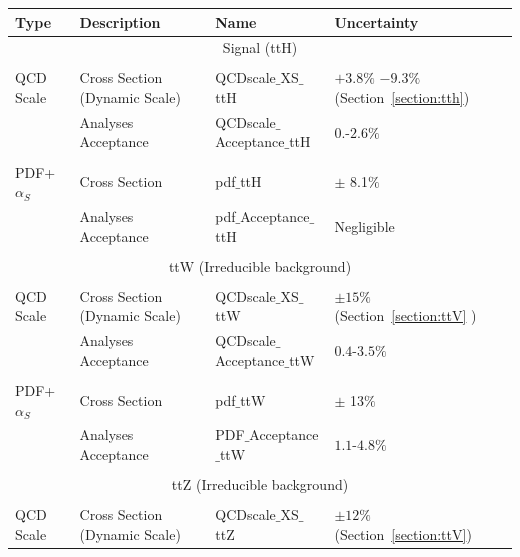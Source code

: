 \begin{table}[htbp]
  \begin{center}
    {\small     
    \begin{tabular}{|llll|}
      \hline
      Type       & Description & Name  &  Uncertainty  \\
     \hline
      \multicolumn{4}{|c|}{Signal (ttH)}\\
     \hline
         &  & &               \\
      QCD Scale                    & Cross Section (Dynamic Scale)&    QCDscale$\_$XS$\_$ttH             &    $+3.8\%$  $-9.3\%$   (Section~\ref{section:tth})      \\
                                            & Analyses Acceptance &    QCDscale$\_$Acceptance$\_$ttH             &    $0.$-$2.6\%$       \\
         & &  &              \\
      PDF+$\alpha_S$     &   Cross Section  &    pdf$\_$ttH         &     $\pm$ 8.1$\%$      \\
                                      &   Analyses Acceptance  &    pdf$\_$Acceptance$\_$ttH         &     Negligible       \\
         & &  &              \\
     \hline
      \multicolumn{4}{|c|}{ttW (Irreducible background)}\\
     \hline
         &  & &               \\
      QCD Scale                    & Cross Section (Dynamic Scale)&    QCDscale$\_$XS$\_$ttW             &    $\pm15\%$  (Section~\ref{section:ttV} )       \\
                                            & Analyses Acceptance &    QCDscale$\_$Acceptance$\_$ttW             &    $0.4$-$3.5\%$        \\
         & &  &              \\
      PDF+$\alpha_S$     &   Cross Section  &    pdf$\_$ttW         &     $\pm$ 13$\%$      \\
                                      &   Analyses Acceptance  &    PDF$\_$Acceptance$\_$ttW         &    $1.1$-$4.8\%$      \\
         & &  &               \\
     \hline
      \multicolumn{4}{|c|}{ttZ (Irreducible background)}\\
     \hline
         &  & &                \\
      QCD Scale                    & Cross Section (Dynamic Scale)&    QCDscale$\_$XS$\_$ttZ             &    $\pm12\%$     (Section~\ref{section:ttV})\\

\end{tabular}}
\end{center}
\end{table}
